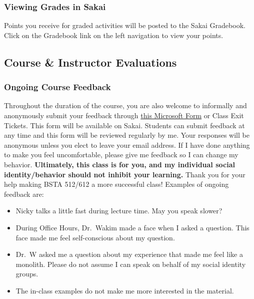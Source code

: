 \documentclass[
  letterpaper,
  DIV=11,
  numbers=noendperiod]{scrartcl}
\begin{document}
\hypertarget{viewing-grades-in-sakai}{%
\subsubsection{Viewing Grades in Sakai}\label{viewing-grades-in-sakai}}

Points you receive for graded activities will be posted to the Sakai
Gradebook. Click on the Gradebook link on the left navigation to view
your points.

\hypertarget{course-instructor-evaluations}{%
\subsection{Course \& Instructor
Evaluations}\label{course-instructor-evaluations}}

\hypertarget{ongoing-course-feedback}{%
\subsubsection{Ongoing Course Feedback}\label{ongoing-course-feedback}}

Throughout the duration of the course, you are also welcome to
informally and anonymously submit your feedback through
\href{https://forms.office.com/Pages/ResponsePage.aspx?id=V3lz4rj6fk2U9pvWr59xWFMopmPUjRtDiHLswhgacNhURDc2S1dGNTlTRVJVUFoyQUUzNFJMS0JXUi4u}{this
Microsoft Form} or Class Exit Tickets. This form will be available on
Sakai. Students can submit feedback at any time and this form will be
reviewed regularly by me. Your responses will be anonymous unless you
elect to leave your email address. If I have done anything to make you
feel uncomfortable, please give me feedback so I can change my behavior.
\textbf{Ultimately, this class is for you, and my individual social
identity/behavior should not inhibit your learning.} Thank you for your
help making BSTA 512/612 a more successful class! Examples of ongoing
feedback are:

\begin{itemize}
\item
  Nicky talks a little fast during lecture time. May you speak slower?
\item
  During Office Hours, Dr.~Wakim made a face when I asked a question.
  This face made me feel self-conscious about my question.
\item
  Dr.~W asked me a question about my experience that made me feel like a
  monolith. Please do not assume I can speak on behalf of my social
  identity groups.
\item
  The in-class examples do not make me more interested in the material.
\end{itemize}
\end{document}
